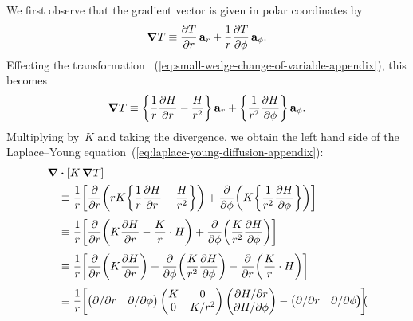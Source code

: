 We first observe that the gradient vector
is given in polar coordinates by
\begin{equation}
  \del T \ideq
    \pder{T}{r} \basisvec{r} + \frac{1}{r} \pder{T}{\phi} \basisvec{\phi}.
  \label{eq:gradient-polar}
\end{equation}
Effecting the transformation~%
  (\ref{eq:small-wedge-change-of-variable-appendix}),
this becomes
\begin{equation}
  \del T \ideq
    \curlybr*{\frac{1}{r} \pder{H}{r} - \frac{H}{r^2}} \basisvec{r}
      +
    \curlybr*{\frac{1}{r^2} \pder{H}{\phi}} \basisvec{\phi}.
  \label{eq:gradient-polar-change-of-variable}
\end{equation}
Multiplying by~$K$ and taking the divergence,
we obtain the left hand side
of the Laplace--Young equation~(\ref{eq:laplace-young-diffusion-appendix}):
\begin{align*}
  \del & \dotp \squarebr{K \del T} \\
  &\ideq
    \frac{1}{r} \squarebr*{
      \pder{}{r} \roundbr*{
        r K \curlybr*{\frac{1}{r} \pder{H}{r} - \frac{H}{r^2}}
      }
        +
      \pder{}{\phi} \roundbr*{
        K \curlybr*{\frac{1}{r^2} \pder{H}{\phi}}
      }
    }
    \\[\tallspace]
  &\ideq
    \frac{1}{r} \squarebr*{
      \pder{}{r} \roundbr*{K \pder{H}{r} - \frac{K}{r} \cdot H}
        +
      \pder{}{\phi} \roundbr*{\frac{K}{r^2} \pder{H}{\phi}}
    }
    \\[\tallspace]
  &\ideq
    \frac{1}{r} \squarebr*{
      \pder{}{r} \roundbr*{K \pder{H}{r}}
        +
      \pder{}{\phi} \roundbr*{\frac{K}{r^2} \pder{H}{\phi}}
        -
      \pder{}{r} \roundbr*{\frac{K}{r} \cdot H}
    }
    \\[\tallspace]
  &\ideq
    \frac{1}{r} \squarebr*{
      \begin{pmatrix}
        \pd / {\pd r} & \pd / {\pd\phi}
      \end{pmatrix}
      \begin{pmatrix}
        K  &  0 \\
        0  &  K / r^2
      \end{pmatrix}
      \begin{pmatrix}
        \pd H / {\pd r} \\
        \pd H / {\pd\phi}
      \end{pmatrix}
        -
      \begin{pmatrix}
        \pd / {\pd r} & \pd / {\pd\phi}
      \end{pmatrix}
      \begin{pmatrix}

\end{pmatrix}}
\end{align*}
